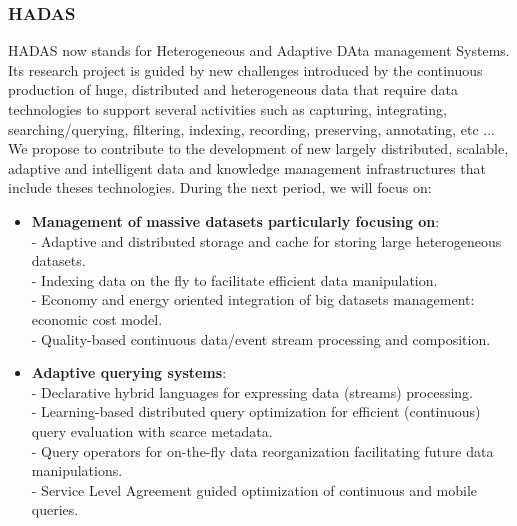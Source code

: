 \subsubsection*{HADAS}

HADAS now stands for Heterogeneous and Adaptive DAta management Systems.  Its research project is guided by new challenges introduced by the continuous production of huge, distributed and heterogeneous data that require data technologies to support  several activities  such as capturing, integrating, searching/querying, filtering, indexing, recording, preserving, annotating, etc ...  
We propose to contribute to the development of new largely distributed, scalable, adaptive and intelligent data and knowledge management infrastructures that include theses technologies. 
During the next period, we will focus on:

\begin{itemize}
\item {\bf Management of massive datasets particularly focusing on}: \\
- Adaptive and distributed storage and cache for storing large heterogeneous datasets.\\
- Indexing data on the fly to facilitate efficient data manipulation.\\
- Economy and energy oriented integration of big datasets management: economic cost model.\\
- Quality-based continuous data/event stream processing and composition.

\item {\bf Adaptive querying systems}: \\
- Declarative hybrid languages for expressing data (streams) processing.\\
- Learning-based distributed query optimization for efficient (continuous) query evaluation with scarce metadata.\\
- Query operators for on-the-fly data reorganization facilitating future data manipulations.\\
- Service Level Agreement  guided optimization of continuous and mobile queries. 

\end{itemize}


